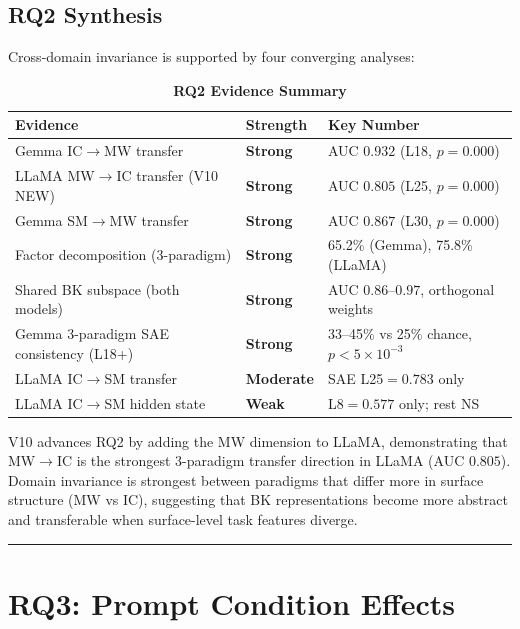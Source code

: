 \documentclass[11pt,a4paper]{article}
\begin{document}
\subsection{RQ2 Synthesis}

Cross-domain invariance is supported by four converging analyses:

\begin{table}[H]
\centering
\caption*{\textbf{RQ2 Evidence Summary}}
\footnotesize
\begin{tabular}{llp{7cm}}
\toprule
Evidence & Strength & Key Number \\
\midrule
Gemma IC$\rightarrow$MW transfer & \textbf{Strong} & AUC $0.932$ (L18, $p=0.000$) \\
LLaMA MW$\rightarrow$IC transfer (V10 NEW) & \textbf{Strong} & AUC $0.805$ (L25, $p=0.000$) \\
Gemma SM$\rightarrow$MW transfer & \textbf{Strong} & AUC $0.867$ (L30, $p=0.000$) \\
Factor decomposition (3-paradigm) & \textbf{Strong} & 65.2\% (Gemma), 75.8\% (LLaMA) \\
Shared BK subspace (both models) & \textbf{Strong} & AUC $0.86$--$0.97$, orthogonal weights \\
Gemma 3-paradigm SAE consistency (L18+) & \textbf{Strong} & 33--45\% vs 25\% chance, $p<5\times10^{-3}$ \\
LLaMA IC$\rightarrow$SM transfer & \textbf{Moderate} & SAE L25$=0.783$ only \\
LLaMA IC$\rightarrow$SM hidden state & \textbf{Weak} & L8$=0.577$ only; rest NS \\
\bottomrule
\end{tabular}
\end{table}

\noindent V10 advances RQ2 by adding the MW dimension to LLaMA, demonstrating that MW$\rightarrow$IC is the strongest 3-paradigm transfer direction in LLaMA (AUC $0.805$). Domain invariance is strongest between paradigms that differ more in surface structure (MW vs IC), suggesting that BK representations become more abstract and transferable when surface-level task features diverge.

\bigskip\hrule\bigskip

\section{RQ3: Prompt Condition Effects}
\end{document}
